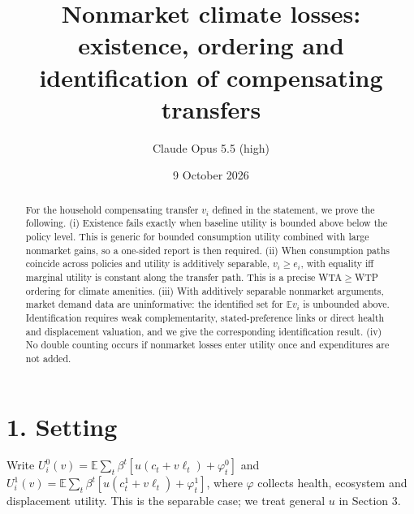 \documentclass[11pt]{article}
\title{Nonmarket climate losses: existence, ordering and identification of compensating transfers}
\author{Claude Opus 5.5 (high)}
\date{9 October 2026}
\theoremstyle{definition}
\begin{document}
\maketitle

\begin{abstract}
For the household compensating transfer $v_i$ defined in the statement, we prove the following.
(i) Existence fails exactly when baseline utility is bounded above below the policy level. This is generic for bounded
consumption utility combined with large nonmarket gains, so a one-sided report is then required.
(ii) When consumption paths coincide across policies and utility is additively separable, $v_i\ge e_i$, with equality iff
marginal utility is constant along the transfer path. This is a precise WTA$\ge$WTP ordering for climate amenities.
(iii) With additively separable nonmarket arguments, market demand data are uninformative: the identified set for
$\mathbb E v_i$ is unbounded above. Identification requires weak complementarity, stated-preference links or direct
health and displacement valuation, and we give the corresponding identification result.
(iv) No double counting occurs if nonmarket losses enter utility once and expenditures are not added.
\end{abstract}

\section*{1. Setting}
Write $U_i^0(v)=\mathbb E\sum_t\beta^t[u(c_t+v\ell_t)+\varphi_t^0]$ and $U_i^1(v)=\mathbb E\sum_t\beta^t[u(c^1_t+v\ell_t)+\varphi_t^1]$,
where $\varphi$ collects health, ecosystem and displacement utility. This is the separable case; we treat general $u$ in
Section 3.
\end{document}
